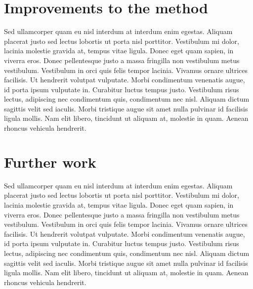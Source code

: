 \section{Improvements to the method}
Sed ullamcorper quam eu nisl interdum at interdum enim egestas. Aliquam placerat justo sed lectus lobortis ut porta nisl porttitor. Vestibulum mi dolor, lacinia molestie gravida at, tempus vitae ligula. Donec eget quam sapien, in viverra eros. Donec pellentesque justo a massa fringilla non vestibulum metus vestibulum. Vestibulum in orci quis felis tempor lacinia. Vivamus ornare ultrices facilisis. Ut hendrerit volutpat vulputate. Morbi condimentum venenatis augue, id porta ipsum vulputate in. Curabitur luctus tempus justo. Vestibulum risus lectus, adipiscing nec condimentum quis, condimentum nec nisl. Aliquam dictum sagittis velit sed iaculis. Morbi tristique augue sit amet nulla pulvinar id facilisis ligula mollis. Nam elit libero, tincidunt ut aliquam at, molestie in quam. Aenean rhoncus vehicula hendrerit.

\section{Further work}
Sed ullamcorper quam eu nisl interdum at interdum enim egestas. Aliquam placerat justo sed lectus lobortis ut porta nisl porttitor. Vestibulum mi dolor, lacinia molestie gravida at, tempus vitae ligula. Donec eget quam sapien, in viverra eros. Donec pellentesque justo a massa fringilla non vestibulum metus vestibulum. Vestibulum in orci quis felis tempor lacinia. Vivamus ornare ultrices facilisis. Ut hendrerit volutpat vulputate. Morbi condimentum venenatis augue, id porta ipsum vulputate in. Curabitur luctus tempus justo. Vestibulum risus lectus, adipiscing nec condimentum quis, condimentum nec nisl. Aliquam dictum sagittis velit sed iaculis. Morbi tristique augue sit amet nulla pulvinar id facilisis ligula mollis. Nam elit libero, tincidunt ut aliquam at, molestie in quam. Aenean rhoncus vehicula hendrerit.